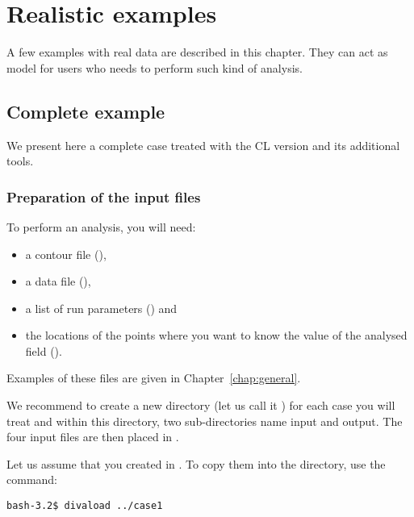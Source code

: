 \chapter{Realistic examples\label{chap:examples}}


A few examples with real data are described in this chapter. They can act as model for users who needs to perform such kind of analysis. 

\minitoc

\newpage

\section{Complete example}

We present here a complete case treated with the CL version and its additional tools.


\subsection{Preparation of the input files\label{prep}}

To perform an analysis, you will need:
\begin{itemize}
\item a contour file (),
\item a data file (), 
\item a list of run parameters () and 
\item the locations of the points where you want to know the value of the analysed field ().
\end{itemize}
Examples of these files are given in Chapter~\ref{chap:general}.

We recommend to create a new directory (let us call it ) for each case you will treat and within this directory, two sub-directories name input and output. The four input files are then placed in . 

Let us assume that you created  in . To copy them into the  directory, use the command: 

\vspace{.25cm}
\begin{lstlisting}[style=Bash]
bash-3.2$ divaload ../case1
\end{lstlisting}


